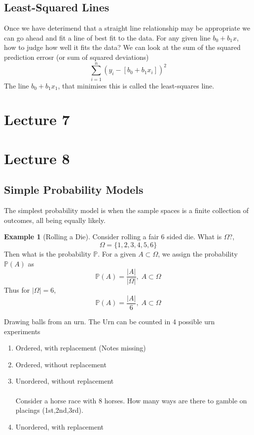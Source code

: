 \documentclass{article}
\theoremstyle{definition}
\newtheorem{example}{Example}
\theoremstyle{plain}
\newtheorem{theorem}{Theorem}
\theoremstyle{remark}
\begin{document}
\subsection{Least-Squared Lines}
Once we have deterimend that a straight line relationship may be appropriate we can go ahead and fit a line of best fit to the data. For any given line $ b_0 + b_1x $, how to judge how well it fits the data? We can look at the sum of the squared prediction errosr (or sum of squared deviations) 
$$ \sum_{i=1}^n (y_i - [b_0 + b_1x_i])^2 $$ 
The line $ b_0 + b_1 x_1 $, that minimises this is called the least-squares line.
\section{Lecture 7}
\section{Lecture 8}
\subsection{Simple Probability Models}
The simplest probability model is when the sample spaces is a finite collection
of outcomes, all being equally likely.
\begin{example}[Rolling a Die]
  Consider rolling a fair 6 sided die. What is $ \Omega $?,
  $$ \Omega = \{1,2,3,4,5,6\} $$
  Then what is the probability $ \mathbb{P} $. For a given $ A \subset \Omega
  $, we assign the probability $ \mathbb{P}(A) $ as 
  $$ \mathbb{P}(A) = \frac{|A|}{|\Omega|}, \; A \subset \Omega $$
  Thus for $ |\Omega| = 6 $,
  $$ \mathbb{P}(A) = \frac{|A|}{6}, \; A \subset \Omega $$
\end{example}
Drawing balls from an urn. The Urn can be counted in 4 possible urn experiments
\begin{enumerate}
  \item Ordered, with replacement
    (Notes missing)
  \item Ordered, without replacement  
  \item Unordered, without replacement \\\\
    Consider a horse race with 8 horses. How many ways are there to gamble on
    placings (1st,2nd,3rd).

  \item Unordered, with replacement
\end{enumerate}
\begin{center}
\end{center}
\end{document}
